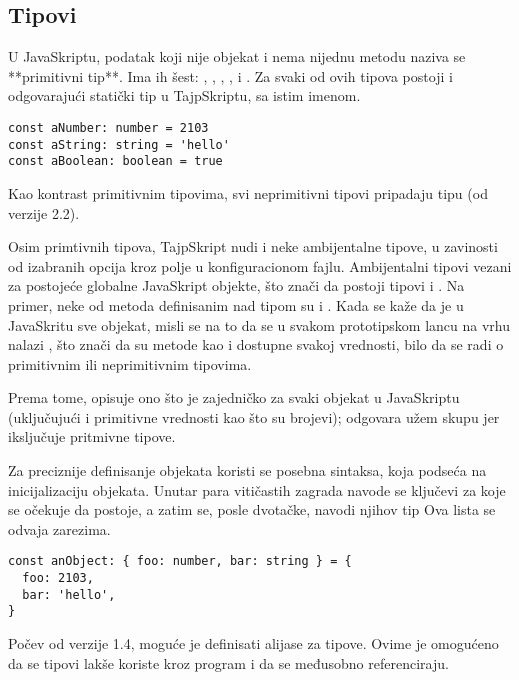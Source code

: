 \subsection{Tipovi}

U JavaSkriptu, podatak koji nije objekat i nema nijednu metodu naziva se **primitivni tip**.
Ima ih šest: , , , ,  i .
Za svaki od ovih tipova postoji i odgovarajući statički tip u TajpSkriptu, sa istim imenom.

\begin{verbatim}
const aNumber: number = 2103
const aString: string = 'hello'
const aBoolean: boolean = true
\end{verbatim}

Kao kontrast primitivnim tipovima, svi neprimitivni tipovi pripadaju tipu  (od verzije 2.2).

Osim primtivnih tipova, TajpSkript nudi i neke ambijentalne tipove, u zavinosti od izabranih opcija kroz polje  u konfiguracionom fajlu.
Ambijentalni tipovi vezani za postojeće globalne JavaSkript objekte, što znači da postoji tipovi  i .
Na primer, neke od metoda definisanim nad tipom  su  i .
Kada se kaže da je u JavaSkritu sve objekat, misli se na to da se u svakom prototipskom lancu na vrhu nalazi , što znači da su metode kao  i  dostupne svakoj vrednosti, bilo da se radi o primitivnim ili neprimitivnim tipovima.

Prema tome,  opisuje ono što je zajedničko za svaki objekat u JavaSkriptu (uključujući i primitivne vrednosti kao što su brojevi);  odgovara užem skupu jer iksljučuje pritmivne tipove.

Za preciznije definisanje objekata koristi se posebna sintaksa, koja podseća na inicijalizaciju objekata.
Unutar para vitičastih zagrada navode se ključevi za koje se očekuje da postoje, a zatim se, posle dvotačke, navodi njihov tip
Ova lista se odvaja zarezima.

\begin{verbatim}
const anObject: { foo: number, bar: string } = {
  foo: 2103,
  bar: 'hello',
}
\end{verbatim}

Počev od verzije 1.4, moguće je definisati alijase za tipove.
Ovime je omogućeno da se tipovi lakše koriste kroz program i da se međusobno referenciraju.

